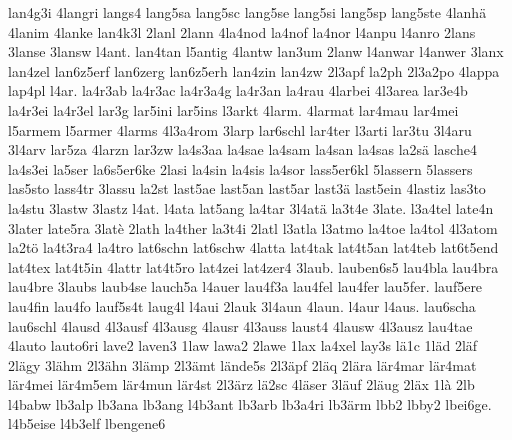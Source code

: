{    lan4g3i
    4langri
    langs4
    lang5sa
    lang5sc
    lang5se
    lang5si
    lang5sp
    lang5ste
    4lanhä
    4lanim
    4lanke
    lan4k3l
    2lanl
    2lann
    4la4nod
    la4nof
    la4nor
    l4anpu
    l4anro
    2lans
    3lanse
    3lansw
    l4ant.
    lan4tan
    l5antig
    4lantw
    lan3um
    2lanw
    l4anwar
    l4anwer
    3lanx
    lan4zel
    lan6z5erf
    lan6zerg
    lan6z5erh
    lan4zin
    lan4zw
    2l3apf
    la2ph
    2l3a2po
    4lappa
    lap4pl
    l4ar.
    la4r3ab
    la4r3ac
    la4r3a4g
    la4r3an
    la4rau
    4larbei
    4l3area
    lar3e4b
    la4r3ei
    la4r3el
    lar3g
    lar5ini
    lar5ins
    l3arkt
    4larm.
    4larmat
    lar4mau
    lar4mei
    l5armem
    l5armer
    4larms
    4l3a4rom
    3larp
    lar6schl
    lar4ter
    l3arti
    lar3tu
    3l4aru
    3l4arv
    lar5za
    4larzn
    lar3zw
    la4s3aa
    la4sae
    la4sam
    la4san
    la4sas
    la2sä
    lasche4
    la4s3ei
    la5ser
    la6s5er6ke
    2lasi
    la4sin
    la4sis
    la4sor
    lass5er6kl
    5lassern
    5lassers
    las5sto
    lass4tr
    3lassu
    la2st
    last5ae
    last5an
    last5ar
    last3ä
    last5ein
    4lastiz
    las3to
    la4stu
    3lastw
    3lastz
    l4at.
    l4ata
    lat5ang
    la4tar
    3l4atä
    la3t4e
    3late.
    l3a4tel
    late4n
    3later
    late5ra
    3latè
    2lath
    la4ther
    la3t4i
    2latl
    l3atla
    l3atmo
    la4toe
    la4tol
    4l3atom
    la2tö
    la4t3ra4
    la4tro
    lat6schn
    lat6schw
    4latta
    lat4tak
    lat4t5an
    lat4teb
    lat6t5end
    lat4tex
    lat4t5in
    4lattr
    lat4t5ro
    lat4zei
    lat4zer4
    3laub.
    lauben6s5
    lau4bla
    lau4bra
    lau4bre
    3laubs
    laub4se
    lauch5a
    l4auer
    lau4f3a
    lau4fel
    lau4fer
    lau5fer.
    lauf5ere
    lau4fin
    lau4fo
    lauf5s4t
    laug4l
    l4aui
    2lauk
    3l4aun
    4laun.
    l4aur
    l4aus.
    lau6scha
    lau6schl
    4lausd
    4l3ausf
    4l3ausg
    4lausr
    4l3auss
    laust4
    4lausw
    4l3ausz
    lau4tae
    4lauto
    lauto6ri
    lave2
    laven3
    1law
    lawa2
    2lawe
    1lax
    la4xel
    lay3s
    lä1c
    1läd
    2läf
    2lägy
    3lähm
    2l3ähn
    3lämp
    2l3ämt
    lände5s
    2l3äpf
    2läq
    2lära
    lär4mar
    lär4mat
    lär4mei
    lär4m5em
    lär4mun
    lär4st
    2l3ärz
    lä2sc
    4läser
    3läuf
    2läug
    2läx
    1là
    2lb
    l4babw
    lb3alp
    lb3ana
    lb3ang
    l4b3ant
    lb3arb
    lb3a4ri
    lb3ärm
    lbb2
    lbby2
    lbei6ge.
    l4b5eise
    l4b3elf
    lbengene6
}
